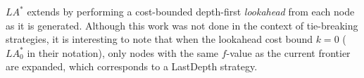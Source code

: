 

$LA^*$ \cite{stern2010look} extends \astar by performing a
cost-bounded depth-first \emph{lookahead} from each node as it is generated.
Although this work was not done in the context of tie-breaking strategies, it is interesting to note that 
when the lookahead cost bound $k=0$ ($LA^*_0$ in their notation), only nodes with the same $f$-value as the current \astar frontier are expanded, which corresponds to a LastDepth strategy.


